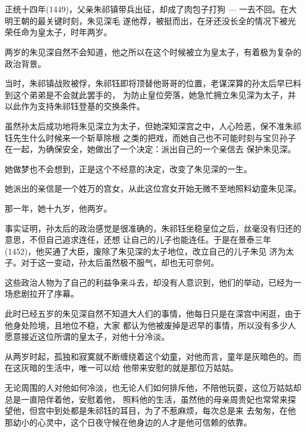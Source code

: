 \documentclass[11pt,a4paper,onecolumn]{article}
\begin{document}
\section[\thesection]{}

正统十四年(1449)，父亲朱祁镇带兵出征，却成了肉包子打狗 --- 一去不回。在大明王朝的最关键时刻，朱见深毛
遂他荐，被挺而出，在牙还没长全的情况下被光荣任命为皇太子，时年两岁。

两岁的朱见深自然不会知道，他之所以在这个时候被立为皇太子，有着极为复杂的政治背景。

当时，朱祁镇战败被俘，朱祁钰即将顶替他哥哥的位置，老谋深算的孙太后早已料到这个弟弟是不会就此罢手的，
为防止皇位旁落，她急忙拥立朱见深为太子，并以此作为支持朱祁钰登基的交换条件。

虽然孙太后成功地将朱见深立为太子，但她深知深宫之中，人心险恶，保不准朱祁钰先生什么时候来一个斩草除根
之类的把戏，而她自己也不可能时刻与宝贝孙子在一起，为确保安全，她做出了一个决定：派出自己的一个亲信去
保护朱见深。

她做梦也不会想到，正是这个不经意的决定，改变了朱见深的一生。

她派出的亲信是一个姓万的宫女，从此这位宫女开始无微不至地照料幼童朱见深。

那一年，她十九岁，他两岁。

事实证明，孙太后的政治感觉是很准确的，朱祁钰坐稳皇位之后，丝毫没有归还的意思，不但自己追求连任，还想
让自己的儿子也能连任。于是在景泰三年(1452)，他买通了大臣，废除了朱见深的太子地位，改立自己的儿子朱见
济为太子。对于这一变动，孙太后虽然极不服气，却也无可奈何。

这些政治人物为了自己的利益争来斗去，却没有人意识到，他们的举动，已经为一场悲剧拉开了序幕。

此时已经五岁的朱见深自然不知道大人们的事情，他每日只是在深宫中闲逛，由于他身处险境，且地位不稳，大家
都认为他被废掉是迟早的事情，所以没有多少人愿意接近这位所谓的皇太子，对他十分冷淡。

从两岁时起，孤独和寂寞就不断缠绕着这个幼童，对他而言，童年是灰暗色的。而在这灰暗的生活中，唯一可以给
他带来安慰的就是那位万姑姑。

无论周围的人对他如何冷淡，也无论人们如何排斥他，不陪他玩耍，这位万姑姑却总是一直陪伴着他，安慰着他，
照料他的生活，虽然他的母亲周贵妃也常常来探望他，但宫中到处都是朱祁钰的耳目，为了不惹麻烦，每次总是来
去匆匆，在他那幼小的心灵中，这个日夜守候在他身边的人才是他可信赖的依靠。

\section[\thesection]{}
\end{document}
